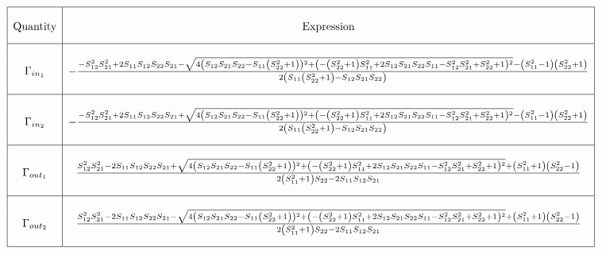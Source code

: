 \[ 
        \begin{array}{|c|c|}
            \hline & \\ \text{Quantity} & \text{Expression}\\[.3cm]
            \hline & \\ \Gamma_{in_1} & -\frac{-S_{12}^2 S_{21}^2+2 S_{11}
                    S_{12} S_{22} S_{21}-\sqrt{4 \left(S_{12} S_{21} S_{22}-S_{11}
                    \left(S_{22}^2+1\right)\right){}^2+\left(-\left(S_{22}^2+1\right)
                    S_{11}^2+2 S_{12} S_{21} S_{22} S_{11}-S_{12}^2
                    S_{21}^2+S_{22}^2+1\right){}^2}-\left(S_{11}^2-1\right)
                    \left(S_{22}^2+1\right)}{2 \left(S_{11} \left(S_{22}^2+1\right)-S_{12}
                    S_{21} S_{22}\right)} \\[.5cm]
            \hline & \\ \Gamma_{in_2} &-\frac{-S_{12}^2 S_{21}^2+2 S_{11} S_{12}
                    S_{22} S_{21}+\sqrt{4 \left(S_{12} S_{21} S_{22}-S_{11}
                    \left(S_{22}^2+1\right)\right){}^2+\left(-\left(S_{22}^2+1\right)
                    S_{11}^2+2 S_{12} S_{21} S_{22} S_{11}-S_{12}^2
                    S_{21}^2+S_{22}^2+1\right){}^2}-\left(S_{11}^2-1\right)
                    \left(S_{22}^2+1\right)}{2 \left(S_{11} \left(S_{22}^2+1\right)-S_{12}
                    S_{21} S_{22}\right)} \\[.5cm]
            \hline & \\ \Gamma_{out_1} & \frac{S_{12}^2 S_{21}^2-2
                    S_{11} S_{12} S_{22} S_{21}+\sqrt{4 \left(S_{12} S_{21}
                    S_{22}-S_{11}
                    \left(S_{22}^2+1\right)\right){}^2+\left(-\left(S_{22}^2+1\right) S_{11}^2+2
                    S_{12} S_{21} S_{22} S_{11}-S_{12}^2
                    S_{21}^2+S_{22}^2+1\right){}^2}+\left(S_{11}^2+1\right)
                    \left(S_{22}^2-1\right)}{2 \left(S_{11}^2+1\right) S_{22}-2 S_{11} S_{12}
                    S_{21}} \\[.5cm]
            \hline & \\ \Gamma_{out_2} & \frac{S_{12}^2 S_{21}^2-2 S_{11} S_{12} S_{22}
                    S_{21}-\sqrt{4 \left(S_{12} S_{21} S_{22}-S_{11}
                    \left(S_{22}^2+1\right)\right){}^2+\left(-\left(S_{22}^2+1\right)
                    S_{11}^2+2 S_{12} S_{21} S_{22} S_{11}-S_{12}^2
                    S_{21}^2+S_{22}^2+1\right){}^2}+\left(S_{11}^2+1\right)
                    \left(S_{22}^2-1\right)}{2 \left(S_{11}^2+1\right) S_{22}-2 S_{11} S_{12}
                    S_{21}} \\[.5cm] \hline
        \end{array}
\]


